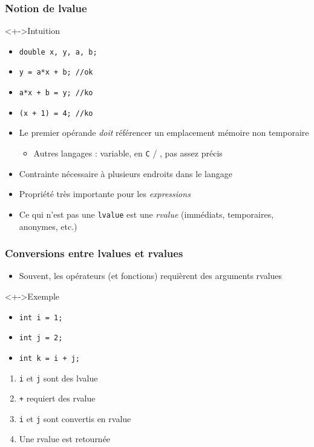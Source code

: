 \begin{frame}
\frametitle{Notion de lvalue}
\begin{exampleblock}<+->{Intuition}
	\begin{itemize}[<+->]
	\item \lstinline|double x, y, a, b;|
	\item \lstinline|y = a*x + b; //ok|
	\item \lstinline|a*x + b = y; //ko|
	\item \lstinline|(x + 1) = 4; //ko|
	\end{itemize}
\end{exampleblock}
\begin{itemize}[<+->]
\item Le premier opérande \emph{doit} référencer un emplacement mémoire non temporaire
	\begin{itemize}
	\item Autres langages : variable, en \texttt{C} / \cpp, pas assez précis
	\end{itemize}
\item Contrainte nécessaire à plusieurs endroits dans le langage %
\item Propriété très importante pour les \emph{expressions}
\item Ce qui n'est pas une \texttt{lvalue} est une \emph{rvalue} (immédiats, temporaires, anonymes, etc.)
\end{itemize}
\end{frame}

\begin{frame}
\frametitle{Conversions entre lvalues et rvalues}
\begin{itemize}[<+->]
\item Souvent, les opérateurs (et fonctions) requièrent des arguments rvalues
\end{itemize}
\begin{exampleblock}<+->{Exemple}
	\begin{itemize}
	\item \lstinline|int i = 1;|
	\item \lstinline|int j = 2;|
	\item \lstinline|int k = i + j;|
	\end{itemize}
\end{exampleblock}
\begin{enumerate}[<+->]
\item \texttt{i} et \texttt{j} sont des lvalue
\item \texttt{+} requiert des rvalue
\item \texttt{i} et \texttt{j} sont convertis en rvalue
\item Une rvalue est retournée
\end{enumerate}
\end{frame}

